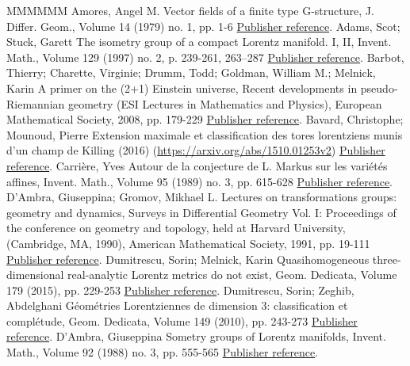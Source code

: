 \begin{thebibliography}{MMMMMM}
 Amores, Angel M. Vector fields of a finite type G-structure, J. Differ. Geom., Volume 14 (1979) no. 1, pp. 1-6 \href{https://ahl.centre-mersenne.org/item/AHL_2020__3__407_0/#amores}{Publisher reference}.
 Adams, Scot; Stuck, Garett The isometry group of a compact Lorentz manifold. I, II, Invent. Math., Volume 129 (1997) no. 2, p. 239-261, 263–287 \href{https://ahl.centre-mersenne.org/item/AHL_2020__3__407_0/#adams.stuck}{Publisher reference}.
 Barbot, Thierry; Charette, Virginie; Drumm, Todd; Goldman, William M.; Melnick, Karin A primer on the (2+1) Einstein universe, Recent developments in pseudo-Riemannian geometry (ESI Lectures in Mathematics and Physics), European Mathematical Society, 2008, pp. 179-229 \href{https://ahl.centre-mersenne.org/item/AHL_2020__3__407_0/#primer}{Publisher reference}.
 Bavard, Christophe; Mounoud, Pierre Extension maximale et classification des tores lorentziens munis d’un champ de Killing (2016) (\url{https://arxiv.org/abs/1510.01253v2}) \href{https://ahl.centre-mersenne.org/item/AHL_2020__3__407_0/#mounoud}{Publisher reference}.
 Carrière, Yves Autour de la conjecture de L. Markus sur les variétés affines, Invent. Math., Volume 95 (1989) no. 3, pp. 615-628 \href{https://ahl.centre-mersenne.org/item/AHL_2020__3__407_0/#carriere}{Publisher reference}.
 D’Ambra, Giuseppina; Gromov, Mikhael L. Lectures on transformations groups: geometry and dynamics, Surveys in Differential Geometry Vol. I: Proceedings of the conference on geometry and topology, held at Harvard University, (Cambridge, MA, 1990), American Mathematical Society, 1991, pp. 19-111 \href{https://ahl.centre-mersenne.org/item/AHL_2020__3__407_0/#dambragro}{Publisher reference}.
 Dumitrescu, Sorin; Melnick, Karin Quasihomogeneous three-dimensional real-analytic Lorentz metrics do not exist, Geom. Dedicata, Volume 179 (2015), pp. 229-253 \href{https://ahl.centre-mersenne.org/item/AHL_2020__3__407_0/#sorin.karin}{Publisher reference}.
 Dumitrescu, Sorin; Zeghib, Abdelghani Géométries Lorentziennes de dimension 3: classification et complétude, Geom. Dedicata, Volume 149 (2010), pp. 243-273 \href{https://ahl.centre-mersenne.org/item/AHL_2020__3__407_0/#sorin.ghani}{Publisher reference}.
 D’Ambra, Giuseppina Sometry groups of Lorentz manifolds, Invent. Math., Volume 92 (1988) no. 3, pp. 555-565 \href{https://ahl.centre-mersenne.org/item/AHL_2020__3__407_0/#dambra}{Publisher reference}.

\end{thebibliography}
